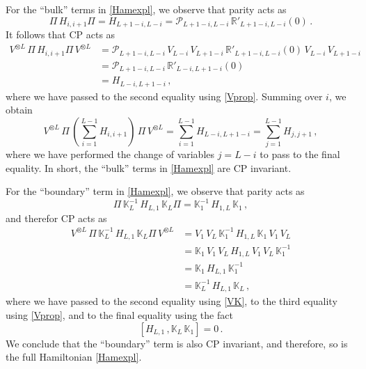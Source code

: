 \documentclass[12pt]{article}
\numberwithin{equation}{section}
\begin{document}
	For the ``bulk'' terms in \eqref{Hamexpl}, we observe that parity acts as
	\begin{equation}
		\Pi\, H_{i,i+1} \Pi = H_{L+1-i,L-i} = \mathcal{P}_{L+1-i,L-i}\, \mathbb{R}'_{L+1-i,L-i}(0) \,.
	\end{equation}
	It follows that CP acts as 
	\begin{align}
		V^{\otimes L}\, \Pi\, H_{i,i+1} \Pi\, V^{\otimes L} &= \mathcal{P}_{L+1-i,L-i}\, V_{L-i}\, V_{L+1-i}\,\mathbb{R}'_{L+1-i,L-i}(0)\,  V_{L-i}\,  V_{L+1-i} \nonumber \\
		&= \mathcal{P}_{L+1-i,L-i}\,\mathbb{R}'_{L-i,L+1-i}(0)\,  \nonumber \\
		&= H_{L-i,L+1-i}\,,
	\end{align}
	where we have passed to the second equality using \eqref{Vprop}. Summing over $i$, we obtain
	\begin{equation}
		V^{\otimes L}\, \Pi\, \left(\sum_{i=1}^{L-1} H_{i,i+1} \right)\, \Pi\, V^{\otimes L} = \sum_{i=1}^{L-1} H_{L-i,L+1-i} = \sum_{j=1}^{L-1} H_{j,j+1}\,,
	\end{equation}
	where we have performed the change of variables $j=L-i$
	to pass to the final equality. In short, the ``bulk'' terms in \eqref{Hamexpl} are CP invariant.
	
	For the ``boundary'' term in \eqref{Hamexpl}, we observe that parity acts as
	\begin{equation}
		\Pi\, \mathbb{K}^{-1}_L\, H_{L,1}\, \mathbb{K}_L  \Pi = \mathbb{K}^{-1}_1\, H_{1,L}\, \mathbb{K}_1 \,,
	\end{equation}
	and therefor CP acts as
	\begin{align}
		V^{\otimes L}\, \Pi\, \mathbb{K}^{-1}_L\, H_{L,1}\, \mathbb{K}_L  \Pi\, V^{\otimes L}  &= V_1\, V_L\, \mathbb{K}^{-1}_1\, H_{1,L}\, \mathbb{K}_1\, V_1\, V_L \nonumber \\
		&= \mathbb{K}_1\, V_1\, V_L\,  H_{1,L}\,  V_1\, V_L\, \mathbb{K}^{-1}_1 \nonumber \\
		&= \mathbb{K}_1\,  H_{L,1}\, \mathbb{K}^{-1}_1 \nonumber \\
		&= \mathbb{K}^{-1}_L\,  H_{L,1}\, \mathbb{K}_L \,,
	\end{align}
	where we have passed to the second equality using \eqref{VK}, to the third equality using \eqref{Vprop}, and to the final equality using the fact
	\begin{equation}
		\left[ H_{L,1}\,, \mathbb{K}_L\, \mathbb{K}_1 \right] = 0 \,.
	\end{equation}
	We conclude that the ``boundary'' term is also CP invariant, and therefore, so is the full Hamiltonian \eqref{Hamexpl}.
	
\end{document}
